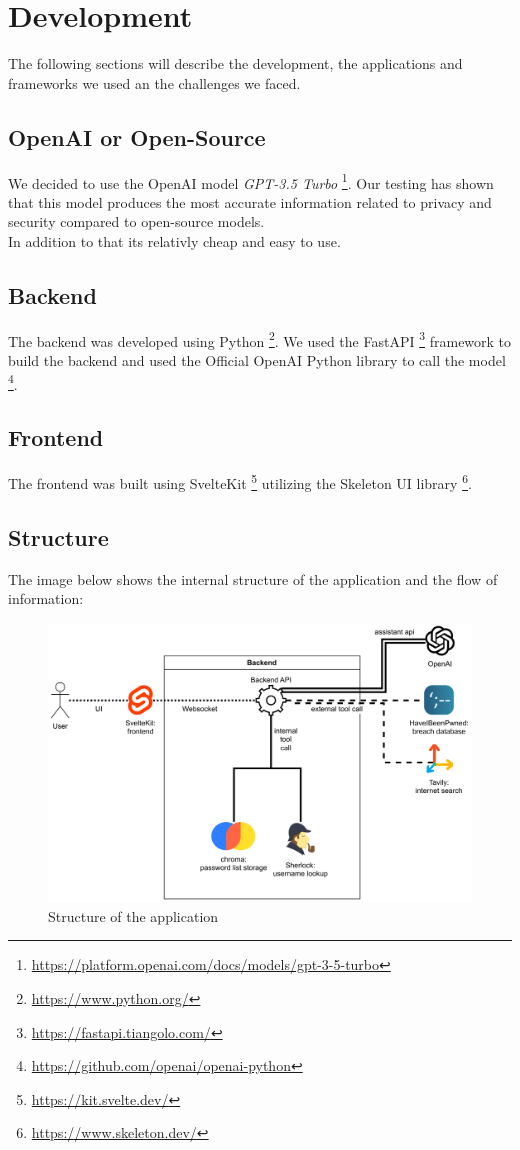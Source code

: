 \documentclass[
    a4paper,
    pagesize,
	pdftex,
    12pt,
]{scrartcl}
\begin{document}
\section{Development}
The following sections will describe the development, the applications and frameworks we used an the challenges we faced.

\subsection{OpenAI or Open-Source}
We decided to use the OpenAI model \textit{GPT-3.5 Turbo} \footnote{\url{https://platform.openai.com/docs/models/gpt-3-5-turbo}}. Our testing has shown that this model produces the most accurate information related to privacy and security compared to open-source models.\\
In addition to that its relativly cheap and easy to use.

\subsection{Backend}
The backend was developed using Python \footnote{\url{https://www.python.org/}}. We used the FastAPI \footnote{\url{https://fastapi.tiangolo.com/}} framework to build the backend and used the Official OpenAI Python library to call the model \footnote{\url{https://github.com/openai/openai-python}}.

\subsection{Frontend}
The frontend was built using SvelteKit \footnote{\url{https://kit.svelte.dev/}} utilizing the Skeleton UI library \footnote{\url{https://www.skeleton.dev/}}.

\subsection{Structure}
The image below shows the internal structure of the application and the flow of information:
\begin{figure}[H]
	\centering
	\includegraphics[width=14cm]{Structure200.png}
	\caption{Structure of the application}
	\label{fig:structure}
\end{figure} 
\end{document}
